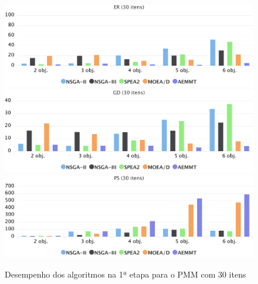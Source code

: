 \begin{figure}[!htbp]
	\includegraphics[width=1\textwidth]{cap_experimentos/figs/etapa1/er-mkp-30}
	\includegraphics[width=1\textwidth]{cap_experimentos/figs/etapa1/gd-mkp-30}
	\includegraphics[width=1\textwidth]{cap_experimentos/figs/etapa1/ps-mkp-30}
	\caption{\label{fig_exp1_pmm_30}Desempenho dos algoritmos na 1ª etapa para o PMM com 30 itens}
\end{figure}

